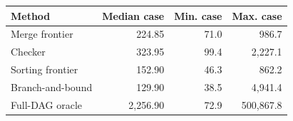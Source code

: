 \begin{tabular}{lrrr}
\toprule
Method & Median case & Min. case & Max. case\\\midrule
Merge frontier & 224.85 & 71.0 & 986.7\\
Checker & 323.95 & 99.4 & 2,227.1\\
Sorting frontier & 152.90 & 46.3 & 862.2\\
Branch-and-bound & 129.90 & 38.5 & 4,941.4\\
Full-DAG oracle & 2,256.90 & 72.9 & 500,867.8\\
\bottomrule
\end{tabular}
